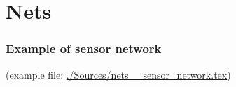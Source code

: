 \section{Nets}
\label{sec:nets}


\begin{frame}
	\frametitle{Example of sensor network}
	(example file: \url{./Sources/nets__sensor_network.tex})
	
\end{frame}


